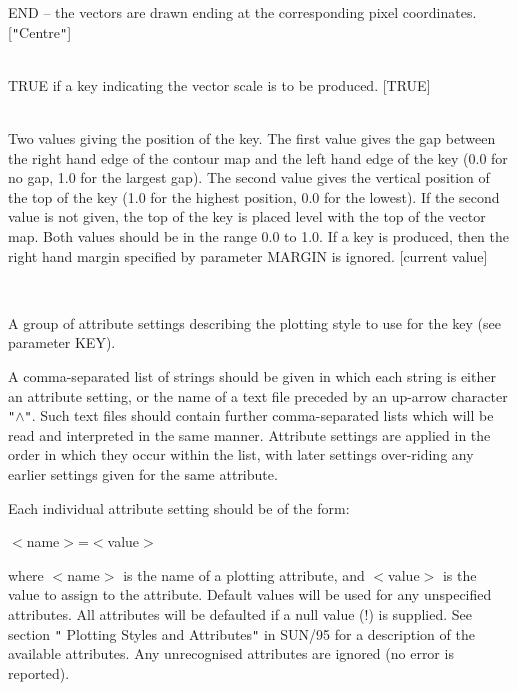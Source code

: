 \documentclass[twoside,11pt]{article}
\newcommand{\xref}[3]{#1}
\renewcommand{\_}{\texttt{\symbol{95}}}
\newcommand{\sstsubsection}[1]{ \item[{#1}] \mbox{} \\}
\newcommand{\sstitem}{\item}
\newcommand{\sstsubsection}[1]{\item[{#1}]}
\newcommand{\sstitem}{\item}
\begin{document}
{{{{            \sstitem
               END -- the vectors are drawn ending at the corresponding
               pixel coordinates.
            [{\tt "}Centre{\tt "}]
         }
      }
      \sstsubsection{
         KEY = \_LOGICAL (Read)
      }{
         TRUE if a key indicating the vector scale is to be produced. [TRUE]
      }
      \sstsubsection{
         KEYPOS() = \_REAL (Read)
      }{
         Two values giving the position of the key. The first value gives
         the gap between the right hand edge of the contour map and the left
         hand edge of the key (0.0 for no gap, 1.0 for the largest gap). The
         second value gives the vertical position of the top of the key (1.0
         for the highest position, 0.0 for the lowest). If the second value
         is not given, the top of the key is placed level with the top of the
         vector map. Both values should be in the range 0.0 to 1.0. If a
         key is produced, then the right hand margin specified by parameter
         MARGIN is ignored. [current value]
      }
      \sstsubsection{
         KEYSTYLE = GROUP (Read)
      }{
         A group of attribute settings describing the plotting style to use
         for the key (see parameter KEY).

         A comma-separated list of strings should be given in which each
         string is either an attribute setting, or the name of a text file
         preceded by an up-arrow character {\tt "}$\wedge${\tt "}. Such text files should
         contain further comma-separated lists which will be read and
         interpreted in the same manner. Attribute settings are applied in
         the order in which they occur within the list, with later settings
         over-riding any earlier settings given for the same attribute.

         Each individual attribute setting should be of the form:

            $<$name$>$=$<$value$>$

         where $<$name$>$ is the name of a plotting attribute, and $<$value$>$ is
         the value to assign to the attribute. Default values will be
         used for any unspecified attributes. All attributes will be
         defaulted if a null value (!) is supplied. See section {\tt "}
         \xref{Plotting Styles and Attributes}{sun95}{se_style}{\tt "} in 
         \xref{SUN/95}{sun95}{} for a description of the available
         attributes. Any unrecognised attributes are ignored (no error is
         reported).

}}}
\end{document}
